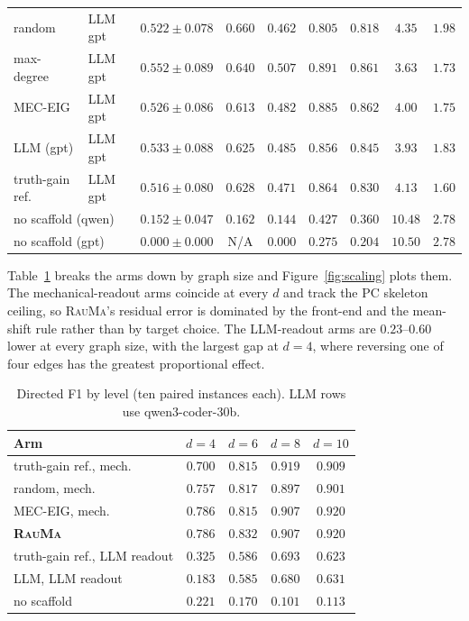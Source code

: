 \documentclass{article}
\newcommand{\rauma}{\textsc{RauMa}}
\begin{document}
\begin{table}[h]
\begin{tabular}{llccccccc}
\midrule
random & LLM gpt & $0.522 \pm 0.078$ & $0.660$ & $0.462$ & $0.805$ & $0.818$ & $4.35$ & $1.98$ \\
max-degree & LLM gpt & $0.552 \pm 0.089$ & $0.640$ & $0.507$ & $0.891$ & $0.861$ & $3.63$ & $1.73$ \\
MEC-EIG & LLM gpt & $0.526 \pm 0.086$ & $0.613$ & $0.482$ & $0.885$ & $0.862$ & $4.00$ & $1.75$ \\
LLM (gpt) & LLM gpt & $0.533 \pm 0.088$ & $0.625$ & $0.485$ & $0.856$ & $0.845$ & $3.93$ & $1.83$ \\
truth-gain ref. & LLM gpt & $0.516 \pm 0.080$ & $0.628$ & $0.471$ & $0.864$ & $0.830$ & $4.13$ & $1.60$ \\
\midrule
\multicolumn{2}{l}{no scaffold (qwen)} & $0.152 \pm 0.047$ & $0.162$ & $0.144$ & $0.427$ & $0.360$ & $10.48$ & $2.78$ \\
\multicolumn{2}{l}{no scaffold (gpt)} & $0.000 \pm 0.000$ & N/A & $0.000$ & $0.275$ & $0.204$ & $10.50$ & $2.78$ \\
\bottomrule
\end{tabular}
\end{table}

Table~\ref{tab:levels} breaks the arms down by graph size and Figure~\ref{fig:scaling} plots
them. The mechanical-readout arms coincide at every $d$ and track the PC skeleton ceiling, so
\rauma{}'s residual error is dominated by the front-end and the mean-shift rule rather than
by target choice. The LLM-readout arms are $0.23$--$0.60$ lower at every graph size, with the
largest gap at $d=4$, where reversing one of four edges has the greatest proportional effect.

\begin{table}[h]
\caption{Directed F1 by level (ten paired instances each). LLM rows use qwen3-coder-30b.}
\label{tab:levels}
\centering
\small
\begin{tabular}{lcccc}
\toprule
Arm & $d=4$ & $d=6$ & $d=8$ & $d=10$ \\
\midrule
truth-gain ref., mech. & $0.700$ & $0.815$ & $0.919$ & $0.909$ \\
random, mech. & $0.757$ & $0.817$ & $0.897$ & $0.901$ \\
MEC-EIG, mech. & $0.786$ & $0.815$ & $0.907$ & $0.920$ \\
\textbf{\rauma} & $0.786$ & $0.832$ & $0.907$ & $0.920$ \\
truth-gain ref., LLM readout & $0.325$ & $0.586$ & $0.693$ & $0.623$ \\
LLM, LLM readout & $0.183$ & $0.585$ & $0.680$ & $0.631$ \\
no scaffold & $0.221$ & $0.170$ & $0.101$ & $0.113$ \\
\bottomrule
\end{tabular}
\end{table}
\end{document}

